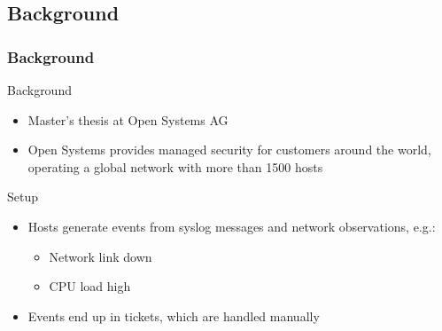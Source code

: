 \documentclass[10pt]{beamer}
\begin{document}
\subsection{Background}
\begin{frame}
	\frametitle{Background}
	\begin{block}{Background}
		\begin{itemize}
			\item Master's thesis at Open Systems AG
			\item Open Systems provides managed security for customers around
				the world, operating a global network with more than 1500
				hosts 
		\end{itemize}
	\end{block}
	\begin{block}{Setup}
		\begin{itemize}
			\item Hosts generate events from syslog messages and network
				observations, e.g.:
				\begin{itemize}
					\item Network link down
					\item CPU load high
				\end{itemize}
			\item Events end up in tickets, which are handled manually
		\end{itemize}
	\end{block}
\end{frame}
\end{document}

